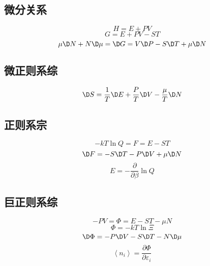 
\subsection{微分关系}
\begin{equation}
  H = E + PV
\end{equation}
\begin{equation}
  G = E + PV - ST
\end{equation}
\begin{equation}
  \mu  \D N + N \D \mu  =  \D G = V \D P - S \D T + \mu  \D N
\end{equation}
\subsection{微正则系综}
\begin{equation}
   \D S = \frac{1}{T} \D E + \frac{P}{T} \D V - \frac{\mu }{T} \D N
\end{equation}
\subsection{正则系宗}
\begin{equation}
   - kT\ln Q = F = E - ST
\end{equation}
\begin{equation}
   \D F =  - S \D T - P \D V + \mu  \D N
\end{equation}
\begin{equation}
  E =  - \frac{\partial }{{\partial \beta }}\ln Q
\end{equation}
\subsection{巨正则系综}
\begin{equation}
   - PV = \Phi  = E - ST - \mu N
\end{equation}
\begin{equation}
  \Phi  =  - kT\ln \Xi 
\end{equation}
\begin{equation}
   \D \Phi  =  - P \D V - S \D T - N \D \mu
\end{equation}
\begin{equation}
  \left\langle {{n_i}} \right\rangle  = \frac{{\partial \Phi }}{{\partial {\varepsilon _i}}}
\end{equation}
